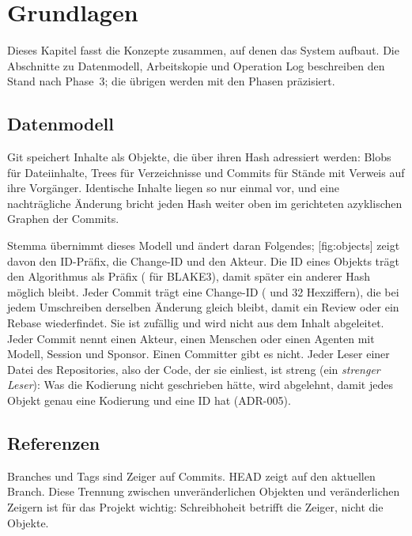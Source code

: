 \chapter[chap:foundations]{Grundlagen}

Dieses Kapitel fasst die Konzepte zusammen, auf denen das System aufbaut.
Die Abschnitte zu Datenmodell, Arbeitskopie und Operation Log beschreiben den Stand
nach Phase~3; die übrigen werden mit den Phasen präzisiert.

\section{Datenmodell}

Git speichert Inhalte als Objekte, die über ihren Hash adressiert werden: Blobs für Dateiinhalte,
Trees für Verzeichnisse und Commits für Stände mit Verweis auf ihre Vorgänger.
Identische Inhalte liegen so nur einmal vor, und eine nachträgliche Änderung bricht jeden Hash
weiter oben im gerichteten azyklischen Graphen der Commits.

\startplacefigure[title={Objektmodell: Commit, Tree und Blob},reference=fig:objects,location=here]
\stopplacefigure

Stemma übernimmt dieses Modell und ändert daran Folgendes;
[fig:objects] zeigt davon den ID-Präfix, die Change-ID und den Akteur.
Die ID eines Objekts trägt den Algorithmus
als Präfix ( für BLAKE3), damit später ein anderer Hash möglich bleibt.
Jeder Commit trägt eine Change-ID ( und 32 Hexziffern),
die bei jedem Umschreiben derselben Änderung gleich bleibt,
damit ein Review oder ein Rebase  wiederfindet.
Sie ist zufällig und wird nicht aus dem Inhalt abgeleitet.
Jeder Commit nennt einen Akteur, einen Menschen oder einen Agenten mit Modell, Session und Sponsor.
Einen Committer gibt es nicht.
Jeder Leser einer Datei des Repositories, also der Code, der sie einliest,
ist streng (ein {\em strenger Leser}): Was die Kodierung nicht geschrieben hätte,
wird abgelehnt, damit jedes Objekt genau eine Kodierung und eine ID hat (ADR-005).

\section{Referenzen}

Branches und Tags sind Zeiger auf Commits. HEAD zeigt auf den aktuellen Branch.
Diese Trennung zwischen unveränderlichen Objekten und veränderlichen Zeigern ist für das Projekt
wichtig: Schreibhoheit betrifft die Zeiger, nicht die Objekte.

